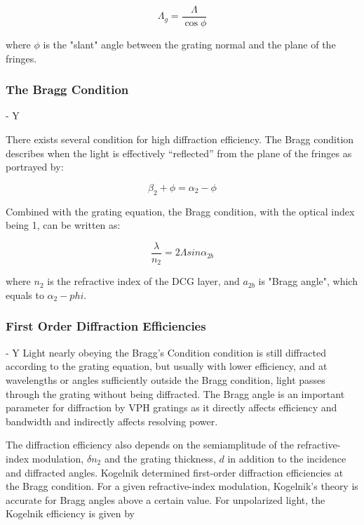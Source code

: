 \begin{equation}
\Lambda_g = \frac{\Lambda}{\cos\phi}
\end{equation}

where $\phi$ is the "slant" angle between the grating normal and the plane of the fringes.

\subsubsection{The Bragg Condition} - Y

There exists several condition for high diffraction efficiency. The Bragg condition describes when the light is effectively “reflected” from the plane of the fringes as portrayed by:

\begin{equation}
\beta_2 + \phi = \alpha_2 - \phi
\end{equation}

Combined with the grating equation, the Bragg condition, with the optical index being 1, can be written as:

\begin{equation}
\frac{\lambda}{n_2} = 2\Lambda sin\alpha_{2b}
\end{equation}

where $n_2$ is the refractive index of the DCG layer, and $a_{2b}$ is "Bragg angle", which equals to $\alpha_2 - phi$. 

\subsubsection{First Order Diffraction Efficiencies} - Y
Light nearly obeying the Bragg's Condition condition is still diffracted according to the grating equation, but usually with lower efficiency, and at wavelengths or angles sufficiently
outside the Bragg condition, light passes through the grating
without being diffracted. The Bragg angle is an important parameter for diffraction by VPH gratings as it directly affects efficiency and bandwidth and indirectly affects resolving power.

The diffraction efficiency also depends on the semiamplitude of the refractive-index modulation, $\delta n_2$ and the grating thickness, $d$ in addition to the incidence and diffracted angles. Kogelnik determined first-order diffraction efficiencies at the Bragg condition. For a given refractive-index modulation, Kogelnik’s theory is accurate for Bragg angles above a certain value. For unpolarized light, the Kogelnik efficiency is given by

